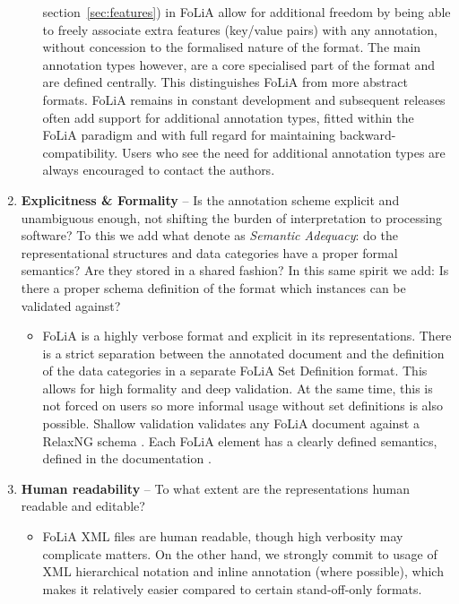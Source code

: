 \documentclass[a4paper,10pt,twoside]{article}
\begin{document}
\begin{enumerate}
\begin{itemize}
      section~\ref{sec:features}) in FoLiA allow for additional freedom by
      being able to freely associate extra features (key/value pairs) with any
      annotation, without concession to the formalised nature of the format.
      The main annotation types however, are a core specialised part of the format and are
      defined centrally. This distinguishes FoLiA from more abstract formats.
      FoLiA remains in constant development and subsequent releases often add
      support for additional annotation types, fitted within the FoLiA paradigm
      and with full regard for maintaining backward-compatibility. Users who
      see the need for additional annotation types are always encouraged to
      contact the authors.
  \end{itemize}
\item \textbf{Explicitness \& Formality} -- Is the annotation scheme explicit
  and unambiguous enough, not shifting the burden of interpretation to
  processing software? To this we add what  denote as
  \emph{Semantic Adequacy}: do the representational structures and data
  categories have a proper formal semantics? Are they stored in a shared
  fashion? In this same spirit we add: Is there a proper schema definition of the
  format which instances can be validated against?
  \begin{itemize}
    \item[] FoLiA is a highly verbose format and explicit in its representations.
      There is a strict separation between the annotated document and the
      definition of the data categories in a separate FoLiA Set Definition
      format. This allows for high formality and deep validation. At the same
      time, this is not forced on users so more informal usage without set
      definitions is also possible. Shallow validation validates any FoLiA
      document against a RelaxNG schema \cite{RELAXNG}. Each FoLiA element has a clearly
      defined semantics, defined in the documentation \cite{FOLIA}.
  \end{itemize}
\item \textbf{Human readability} -- To what extent are the representations human readable and editable?
\begin{itemize}
    \item[] FoLiA XML files are human readable, though high verbosity may
      complicate matters. On the other hand, we strongly commit to usage of XML hierarchical notation
      and inline annotation (where possible), which makes it relatively easier
      compared to certain stand-off-only formats. 

\end{itemize}
\end{enumerate}
\end{document}
